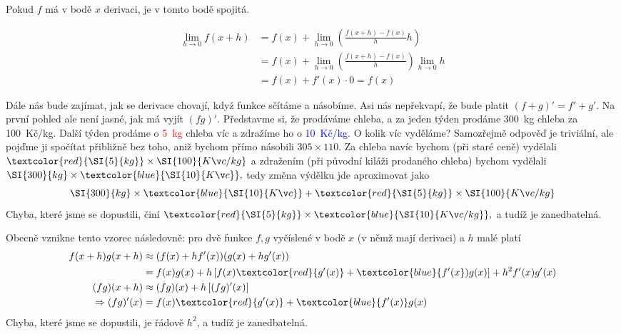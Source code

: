 \begin{věta}
	Pokud $f$ má v bodě $x$ derivaci, je v tomto bodě spojitá.
\end{věta}
\begin{důkaz}
	\begin{align*}
		\lim_{h\to 0}f(x+h) &= f(x)+\lim_{h\to 0}\left(\frac{f(x+h)-f(x)}{h}h\right) \\
				    &= f(x)+ \lim_{h\to 0}\left(\frac{f(x+h)-f(x)}{h}\right)\lim_{h\to 0}h \\
				    &= f(x) + f'(x)\cdot 0 = f(x)
	\end{align*}
\end{důkaz}

Dále nás bude zajímat, jak se derivace chovají, když funkce sčítáme a násobíme. Asi nás nepřekvapí, že bude platit $(f+g)'=f'+g'.$ Na první pohled ale není jasné, jak má vyjít $(fg)'$. Představme si, že prodáváme chleba, a za jeden týden prodáme \SI{300}{kg} chleba za \SI{100}{Kč/kg}. Další týden prodáme o \textcolor{red}{\SI{5}{kg}} chleba víc a zdražíme ho o \textcolor{blue}{\SI{10}{Kč/kg}}. O kolik víc vyděláme? Samozřejmě odpověď je triviální, ale pojďme ji spočítat přibližně bez toho, aniž bychom přímo násobili $305\times 110$. Za chleba navíc bychom (při staré ceně) vydělali $\textcolor{red}{\SI{5}{kg}}\times\SI{100}{Kč/kg}$ a zdražením (při původní kiláži prodaného chleba) bychom vydělali $\SI{300}{kg}\times\textcolor{blue}{\SI{10}{Kč}},$ tedy změna výdělku jde aproximovat jako
\begin{equation*}
	\SI{300}{kg}\times\textcolor{blue}{\SI{10}{Kč}}+\textcolor{red}{\SI{5}{kg}}\times\SI{100}{Kč/kg}
\end{equation*}
Chyba, které jsme se dopustili, činí $\textcolor{red}{\SI{5}{kg}}\times\textcolor{blue}{\SI{10}{Kč/kg}},$ a tudíž je zanedbatelná.

Obecně vznikne tento vzorec následovně: pro dvě funkce $f,g$ vyčíslené v bodě $x$ (v němž mají derivaci) a $h$ malé platí
\begin{align*}
	f(x+h)g(x+h) &\approx (f(x)+hf'(x))(g(x)+hg'(x)) \\
		     &= f(x)g(x)+ h\left[f(x)\textcolor{red}{g'(x)}+\textcolor{blue}{f'(x})g(x)\right] + h^{2}f'(x)g'(x) \\
	(fg)(x+h)    &\approx (fg)(x) + h\left[(fg)'(x)\right] \\
	\Rightarrow  (fg)'(x) &= f(x)\textcolor{red}{g'(x)}+\textcolor{blue}{f'(x)}g(x)
\end{align*}
Chyba, které jsme se dopustili, je řádově $h^{2}$, a tudíž je zanedbatelná.

